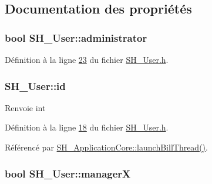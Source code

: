 \subsection{Documentation des propriétés}
\hypertarget{classSH__User_ab57f23cf224a8c5bdd191ca501549220}{
\subsubsection[{administrator}]{\setlength{\rightskip}{0pt plus 5cm}bool S\-H\-\_\-\-User\-::administrator\hspace{0.3cm}{\ttfamily [read]}}}\label{classSH__User_ab57f23cf224a8c5bdd191ca501549220}


Définition à la ligne \hyperlink{SH__User_8h_source_l00023}{23} du fichier \hyperlink{SH__User_8h_source}{S\-H\-\_\-\-User.\-h}.

\hypertarget{classSH__User_a187ee34e1d6d3466f3852e091cdb69e9}{
\subsubsection[{id}]{\setlength{\rightskip}{0pt plus 5cm}S\-H\-\_\-\-User\-::id\hspace{0.3cm}{\ttfamily [read]}}}\label{classSH__User_a187ee34e1d6d3466f3852e091cdb69e9}
\begin{DoxyReturn}{Renvoie}
int 
\end{DoxyReturn}


Définition à la ligne \hyperlink{SH__User_8h_source_l00018}{18} du fichier \hyperlink{SH__User_8h_source}{S\-H\-\_\-\-User.\-h}.



Référencé par \hyperlink{classSH__ApplicationCore_ab72fd6cdc47575d47157fc7bdffae8f2}{S\-H\-\_\-\-Application\-Core\-::launch\-Bill\-Thread()}.

\hypertarget{classSH__User_a1794a1229076bcaf2de708146db574b3}{
\subsubsection[{manager\-X}]{\setlength{\rightskip}{0pt plus 5cm}bool S\-H\-\_\-\-User\-::manager\-X\hspace{0.3cm}{\ttfamily [read]}}}\label{classSH__User_a1794a1229076bcaf2de708146db574b3}


